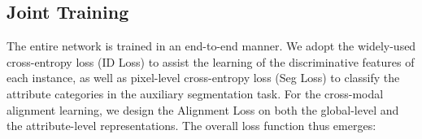 \documentclass[runningheads]{llncs}
\begin{document}
\begin{center}
\end{center}

\subsection{Joint Training}
The entire network is trained in an end-to-end manner. We adopt the widely-used cross-entropy loss (ID Loss) to assist the learning of the discriminative features of each instance, as well as pixel-level cross-entropy loss (Seg Loss) to classify the attribute categories in the auxiliary segmentation task. For the cross-modal alignment learning, we design the Alignment Loss on both the global-level and the attribute-level representations. The overall loss function thus emerges:
\end{document}

